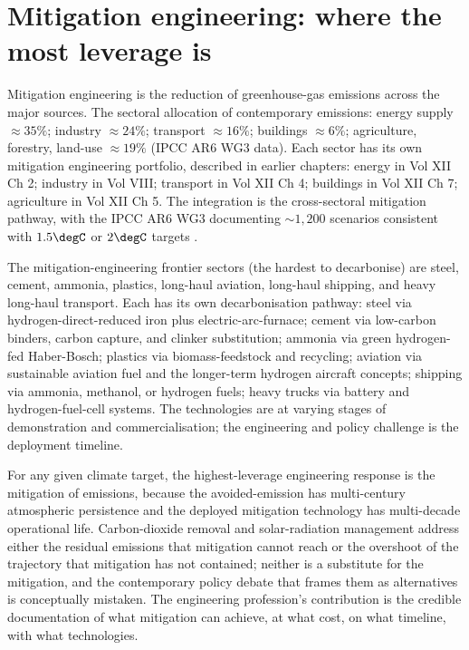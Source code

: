 \section{Mitigation engineering: where the most leverage is}

Mitigation engineering is the reduction of greenhouse-gas emissions across the major sources. The sectoral allocation of contemporary emissions: energy supply $\approx 35\%$; industry $\approx 24\%$; transport $\approx 16\%$; buildings $\approx 6\%$; agriculture, forestry, land-use $\approx 19\%$ (IPCC AR6 WG3 data). Each sector has its own mitigation engineering portfolio, described in earlier chapters: energy in Vol XII Ch 2; industry in Vol VIII; transport in Vol XII Ch 4; buildings in Vol XII Ch 7; agriculture in Vol XII Ch 5. The integration is the cross-sectoral mitigation pathway, with the IPCC AR6 WG3 documenting $\sim 1{,}200$ scenarios consistent with $1.5\degC$ or $2\degC$ targets \cite{std:ipcc-ar6-wg3-2022}.

The mitigation-engineering frontier sectors (the hardest to decarbonise) are steel, cement, ammonia, plastics, long-haul aviation, long-haul shipping, and heavy long-haul transport. Each has its own decarbonisation pathway: steel via hydrogen-direct-reduced iron plus electric-arc-furnace; cement via low-carbon binders, carbon capture, and clinker substitution; ammonia via green hydrogen-fed Haber-Bosch; plastics via biomass-feedstock and recycling; aviation via sustainable aviation fuel and the longer-term hydrogen aircraft concepts; shipping via ammonia, methanol, or hydrogen fuels; heavy trucks via battery and hydrogen-fuel-cell systems. The technologies are at varying stages of demonstration and commercialisation; the engineering and policy challenge is the deployment timeline.

\begin{principle}
For any given climate target, the highest-leverage engineering response is the mitigation of emissions, because the avoided-emission has multi-century atmospheric persistence and the deployed mitigation technology has multi-decade operational life. Carbon-dioxide removal and solar-radiation management address either the residual emissions that mitigation cannot reach or the overshoot of the trajectory that mitigation has not contained; neither is a substitute for the mitigation, and the contemporary policy debate that frames them as alternatives is conceptually mistaken. The engineering profession's contribution is the credible documentation of what mitigation can achieve, at what cost, on what timeline, with what technologies.
\end{principle}

